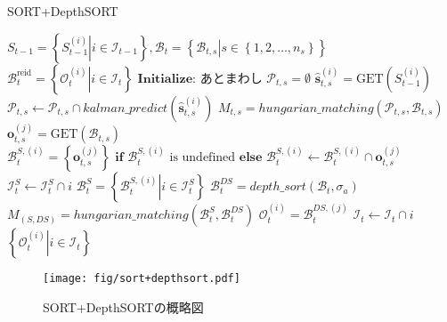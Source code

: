     \begin{algorithm}[t]
        \caption{SORT+DepthSORT}
        \label{alg:SORT+DepthSORT}
        \begin{algorithmic}[1]
            \REQUIRE $S_{t-1} = \left\{\left.S_{t-1}^{(i)}\right| i \in \mathcal{I}_{t-1}\right\}, \mathcal{B}_t = \left\{\left.\mathcal{B}_{t,s} \right| s \in \left\{1, 2, \dots, n_s\right\}\right\}$
            \ENSURE $\mathcal{B}_t^{\text{reid}} = \left\{\left.\mathcal{O}_t^{(i)}\right|i \in \mathcal{I}_t\right\}$
            \STATE $\textbf{Initialize: } \text{あとまわし}$
                \STATE $\mathcal{P}_{t,s} = \emptyset$
                    \STATE $\hat{\bm{s}}_{t,s}^{(i)} = \text{GET}(S_{t-1}^{(i)})$
                    \STATE $\mathcal{P}_{t,s} \leftarrow \mathcal{P}_{t,s} \cap kalman\_predict(\hat{\bm{s}}_{t,s}^{(i)})$
                \ENDFOR
                \STATE $M_{t,s} = hungarian\_matching(\mathcal{P}_{t,s}, \mathcal{B}_{t,s})$
                    \STATE $\bm{o}_{t,s}^{(j)} = \text{GET}(\mathcal{B}_{t,s})$
                    \STATE $\mathcal{B}_t^{S,(i)} = \left\{\bm{o}_{t,s}^{(j)}\right\} \textbf{ if } \mathcal{B}_t^{S,(i)} \text{ is undefined} \textbf{ else } \mathcal{B}_t^{S,(i)} \leftarrow \mathcal{B}_t^{S,(i)} \cap \bm{o}_{t,s}^{(j)}$
                    \STATE $\mathcal{I}_t^{S} \leftarrow \mathcal{I}_t^{S} \cap i$
                \ENDFOR
                \STATE $\mathcal{B}_t^{S} = \left\{\left.\mathcal{B}_t^{S,(i)}\right|i \in \mathcal{I}_t^{S}\right\}$
            \ENDFOR
            \STATE $\mathcal{B}_t^{DS} = depth\_sort(\mathcal{B}_t, \sigma_a)$
            \STATE $M_{(S,DS)} = hungarian\_matching(\mathcal{B}_t^{S}, \mathcal{B}_t^{DS})$
                \STATE $\mathcal{O}_t^{(i)} = \mathcal{B}_t^{DS, (j)}$
                \STATE $\mathcal{I}_t \leftarrow \mathcal{I}_t \cap i$
            \ENDFOR
            \RETURN $\left\{\left.\mathcal{O}_t^{(i)}\right| i \in \mathcal{I}_t\right\}$
        \end{algorithmic}
    \end{algorithm}

    \begin{figure}[t]
        \centering
        \texttt{[image: fig/sort+depthsort.pdf]}
        \caption{SORT+DepthSORTの概略図}
        \label{fig:sort+depthsort}
    \end{figure}
